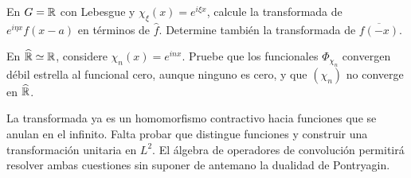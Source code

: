 \begin{ejercicio}\label{ej:v4-ampl-15-2}
En $G=\mathbb R$ con Lebesgue y $\chi_\xi(x)=e^{i\xi x}$, calcule la transformada de $e^{i\eta x}f(x-a)$ en términos de $\widehat f$. Determine también la transformada de $\overline{f(-x)}$.
\end{ejercicio}


\begin{ejercicio}\label{ej:v4-ampl-15-3}
En $\widehat{\mathbb R}\simeq\mathbb R$, considere $\chi_n(x)=e^{inx}$. Pruebe que los funcionales $\Phi_{\chi_n}$ convergen débil estrella al funcional cero, aunque ninguno es cero, y que $(\chi_n)$ no converge en $\widehat{\mathbb R}$.
\end{ejercicio}


La transformada ya es un homomorfismo contractivo hacia funciones que se anulan en el infinito. Falta probar que distingue funciones y construir una transformación unitaria en $L^2$. El álgebra de operadores de convolución permitirá resolver ambas cuestiones sin suponer de antemano la dualidad de Pontryagin.

